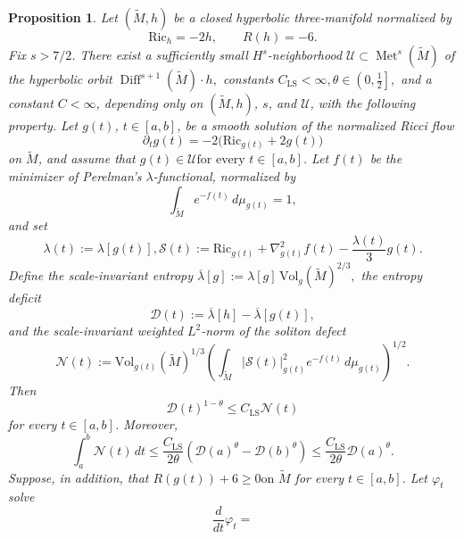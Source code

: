 \documentclass{amsart}
\newtheorem{proposition}{Proposition}[section]
\begin{document}
\begin{proposition}
\label{LSpath}
Let $(\widetilde M,h)$ be a closed hyperbolic three-manifold normalized by
\[
        \text{Ric}_h=-2h,
        \qquad
        R(h)=-6.
\]
Fix \(s>7/2\). There exist a sufficiently small
\(H^s\)-neighborhood
$\mathcal U
        \subset \operatorname{Met}^{s}(\widetilde M)$
of the hyperbolic orbit
$\operatorname{Diff}^{s+1}(\widetilde M)\cdot h,$
constants
$C_{\mathrm{LS}}<\infty, 
        \theta\in\left(0,\frac12\right],$
and a constant $C<\infty$, depending only on
\((\widetilde M,h)\), \(s\), and \(\mathcal U\), with the following
property. Let \(g(t)\), \(t\in[a,b]\), be a smooth solution of the normalized
Ricci flow
\[
        \partial_tg(t)
        =
        -2\bigl(\text{Ric}_{g(t)}+2g(t)\bigr)
\]
on \(\widetilde M\), and assume that
$g(t)\in\mathcal U 
        \text{for every }t\in[a,b]$.
Let \(f(t)\) be the minimizer of Perelman's \(\lambda\)-functional,
normalized by
\[
        \int_{\widetilde M}
        e^{-f(t)}\,d\mu_{g(t)}=1,
\]
and set
\[
        \lambda(t):=\lambda[g(t)],
\mathcal S(t)
        :=
        \text{Ric}_{g(t)}
        +
        \nabla^2_{g(t)}f(t)
        -
        \frac{\lambda(t)}{3}g(t).
\]
Define the scale-invariant entropy
$\overline\lambda[g]        :=
        \lambda[g]\,
        \text{Vol}_g(\widetilde M)^{2/3},$
the entropy deficit
\[
        \mathcal D(t)
        :=
        \overline\lambda[h]
        -
        \overline\lambda[g(t)],
\]
and the scale-invariant weighted \(L^2\)-norm of the soliton defect
\[
        \mathcal N(t)
        :=
        \text{Vol}_{g(t)}(\widetilde M)^{1/3}
        \left(
        \int_{\widetilde M}
        |\mathcal S(t)|_{g(t)}^2
        e^{-f(t)}\,d\mu_{g(t)}
        \right)^{1/2}.
\]
Then
\begin{equation}
\label{eq:LS-good-component}
        \mathcal D(t)^{1-\theta}
        \leq
        C_{\mathrm{LS}}\mathcal N(t)
\end{equation}
for every \(t\in[a,b]\). Moreover,
\begin{equation}
\label{eq:LS-interval-path}
        \int_a^b\mathcal N(t)\,dt
        \leq
        \frac{C_{\mathrm{LS}}}{2\theta}
        \left(
        \mathcal D(a)^\theta
        -
        \mathcal D(b)^\theta
        \right)
        \leq
        \frac{C_{\mathrm{LS}}}{2\theta}
        \mathcal D(a)^\theta .
\end{equation}
Suppose, in addition, that
$R(g(t))+6\geq0  
        \text{on }\widetilde M
$
for every \(t\in[a,b]\). Let \(\varphi_t\) solve
\[
        \frac{d}{dt}\varphi_t
        =
\]
\end{proposition}
\end{document}
